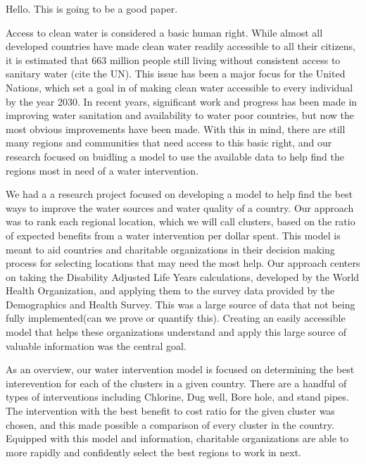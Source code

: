 Hello. This is going to be a good paper.

Access to clean water is considered a basic human right. While almost all developed countries have made clean water readily accessible to all their citizens, it is estimated that 663 million people still living without consistent access to sanitary water (cite the UN).
This issue has been a major focus for the United Nations, which set a goal in of making clean water accessible to every individual by the year 2030.
In recent years, significant work and progress has been made in improving water sanitation and availability to water poor countries, but now the most obvious improvements have been made.
With this in mind, there are still many regions and communities that need access to this basic right, and our research focused on buidling a model to use the available data to help find the regions most in need of a water intervention.  

We had a a research project focused on developing a model to help find the best ways to improve the water sources and water quality of a country.
Our approach was to rank each regional location, which we will call clusters, based on the ratio of expected benefits from a water intervention per dollar spent.
This model is meant to aid countries and charitable organizations in their decision making process for selecting locations that may need the most help.
Our approach centers on taking the Disability Adjusted Life Years calculations, developed by the World Health Organization, and applying them to the survey data provided by the Demographics and Health Survey.
This was a large source of data that not being fully implemented(can we prove or quantify this).
Creating an easily accessible model that helps these organizations understand and apply this large source of valuable information was the central goal.  

As an overview, our water intervention model is focused on determining the best interevention for each of the clusters in a given country.
There are a handful of types of interventions including Chlorine, Dug well, Bore hole, and stand pipes.
The intervention with the best benefit to cost ratio for the given cluster was chosen, and this made possible a comparison of every cluster in the country.
Equipped with this model and information, charitable organizations are able to more rapidly and confidently select the best regions to work in next.